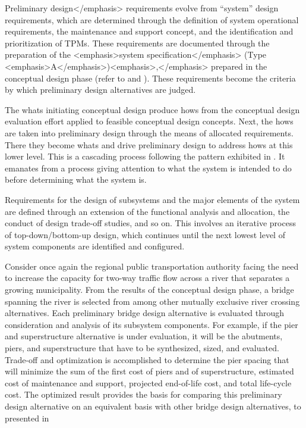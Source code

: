 Preliminary design</emphasis> requirements evolve from “system” design requirements, which are determined through the definition of system operational requirements, the maintenance and support concept, and the identification and prioritization of TPMs. These requirements are documented through the preparation of the <emphasis>system specification</emphasis> (Type <emphasis>A</emphasis>)<emphasis>,</emphasis> prepared in the conceptual design phase (refer to  and ). These requirements become the criteria by which preliminary design alternatives are judged.

The whats initiating conceptual design produce hows from the conceptual design evaluation effort applied to feasible conceptual design concepts. Next, the hows are taken into preliminary design through the means of allocated requirements. There they become whats and drive preliminary design to address hows at this lower level. This is a cascading process following the pattern exhibited in . It emanates from a process giving attention to what the system is intended to do before determining what the system is.

Requirements for the design of subsystems and the major elements of the system are defined through an extension of the functional analysis and allocation, the conduct of design trade-off studies, and so on. This involves an iterative process of top-down/bottom-up design, which continues until the next lowest level of system components are identified and configured.

Consider once again the regional public transportation authority facing the need to increase the capacity for two-way traffic flow across a river that separates a growing municipality. From the results of the conceptual design phase, a bridge spanning the river is selected from among other mutually exclusive river crossing alternatives. Each preliminary bridge design alternative is evaluated through consideration and analysis of its subsystem components. For example, if the pier and superstructure alternative is under evaluation, it will be the abutments, piers, and superstructure that have to be synthesized, sized, and evaluated. Trade-off and optimization is accomplished to determine the pier spacing that will minimize the sum of the first cost of piers and of superstructure, estimated cost of maintenance and support, projected end-of-life cost, and total life-cycle cost. The optimized result provides the basis for comparing this preliminary design alternative on an equivalent basis with other bridge design alternatives, to presented in 


